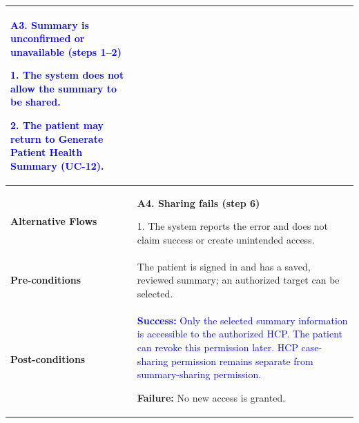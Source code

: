 \begin{longtable}{|p{}|p{}|}
\textcolor{blue}{\textbf{A3. Summary is unconfirmed or unavailable (steps 1--2)}}\par
\textcolor{blue}{1. The system does not allow the summary to be shared.}\par
\textcolor{blue}{2. The patient may return to Generate Patient Health Summary (UC-12).}
\\ \hline
\textbf{Alternative Flows} &
\textbf{A4. Sharing fails (step 6)}\par
1. The system reports the error and does not claim success or create unintended access.
\\ \hline
\textbf{Pre-conditions} &
The patient is signed in and has a saved, reviewed summary; an authorized target can be selected.
\\ \hline
\textbf{Post-conditions} &
\textcolor{blue}{\textbf{Success:} Only the selected summary information is accessible to the authorized HCP. The patient can revoke this permission later. HCP case-sharing permission remains separate from summary-sharing permission.}\par
\textbf{Failure:} No new access is granted.
\\ \hline
\end{longtable}
\clearpage
